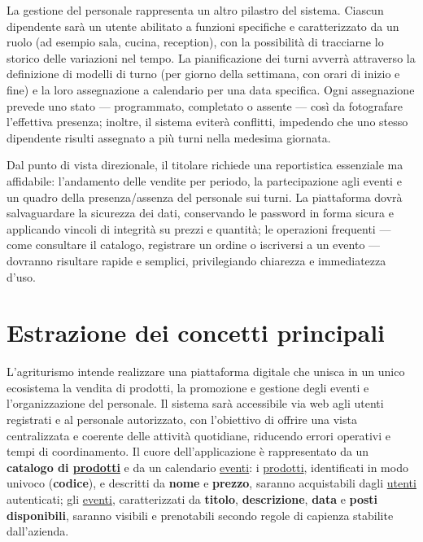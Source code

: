 \documentclass[a4paper,12pt]{report}
\begin{document}
La gestione del personale rappresenta un altro pilastro del sistema. Ciascun dipendente sarà un 
utente abilitato a funzioni specifiche e caratterizzato da un ruolo (ad esempio sala, cucina, 
reception), con la possibilità di tracciarne lo storico delle variazioni nel tempo. La 
pianificazione dei turni avverrà attraverso la definizione di modelli di turno (per giorno della 
settimana, con orari di inizio e fine) e la loro assegnazione a calendario per una data 
specifica. Ogni assegnazione prevede uno stato — programmato, completato o assente — così da 
fotografare l'effettiva presenza; inoltre, il sistema eviterà conflitti, impedendo che uno 
stesso dipendente risulti assegnato a più turni nella medesima giornata.

Dal punto di vista direzionale, il titolare richiede una reportistica essenziale ma 
affidabile: l'andamento delle vendite per periodo, la partecipazione agli eventi e un quadro 
della presenza/assenza del personale sui turni. La piattaforma dovrà salvaguardare la sicurezza 
dei dati, conservando le password in forma sicura e applicando vincoli di integrità su prezzi e 
quantità; le operazioni frequenti — come consultare il catalogo, registrare un ordine o 
iscriversi a un evento — dovranno risultare rapide e semplici, privilegiando chiarezza e 
immediatezza d'uso.

\section{Estrazione dei concetti principali}

L'agriturismo intende realizzare una piattaforma digitale che unisca in un unico ecosistema la 
vendita di prodotti, la promozione e gestione degli eventi e l'organizzazione del personale. Il 
sistema sarà accessibile via web agli utenti registrati e al personale autorizzato, con 
l'obiettivo di offrire una vista centralizzata e coerente delle attività quotidiane, riducendo 
errori operativi e tempi di coordinamento. Il cuore dell'applicazione è rappresentato da un 
\textbf{catalogo di \underline{prodotti}} e da un calendario \underline{eventi}: i 
\underline{prodotti}, identificati in modo univoco (\textbf{codice}), e descritti da 
\textbf{nome} e \textbf{prezzo}, saranno acquistabili dagli \underline{utenti} autenticati; gli 
\underline{eventi}, caratterizzati da \textbf{titolo}, \textbf{descrizione}, \textbf{data} e 
\textbf{posti disponibili}, saranno visibili e prenotabili secondo regole di capienza stabilite 
dall'azienda.
\end{document}
